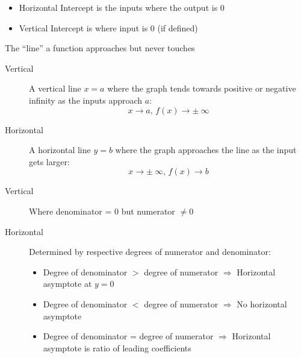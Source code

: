   \begin{itemize}
    \item Horizontal Intercept is the inputs where the output is 0
    \item Vertical Intercept is where input is 0 (if defined)        
  \end{itemize}

\hformbar




The ``line'' a function approaches but never touches

\begin{description}
	\item[Vertical] A vertical line $x = a$ where the graph tends towards positive or negative 
	                infinity as the inputs approach $a$:
	                \begin{equation}
	                    x \rightarrow a,\, f(x) \rightarrow \pm~ \infty
	                \end{equation}
	\item[Horizontal] A horizontal line $y = b$ where the graph approaches the line as the
	                  input gets larger:
	                   \begin{equation}
	                       x \rightarrow \pm~ \infty,\, f(x) \rightarrow b
	                   \end{equation}
\end{description}
\hformbar




\begin{description}
    \item[Vertical] Where denominator = 0 but numerator $\neq 0$
    \item[Horizontal] Determined by respective degrees of numerator and denominator:
        \begin{itemize}
            \item Degree of denominator $>$ degree of numerator $\Rightarrow$ Horizontal asymptote at $y = 0$
            \item Degree of denominator $<$ degree of numerator $\Rightarrow$ No horizontal asymptote
            \item Degree of denominator = degree of numerator $\Rightarrow$ Horizontal asymptote is ratio of leading coefficients
        \end{itemize}
\end{description}
\hformbar




